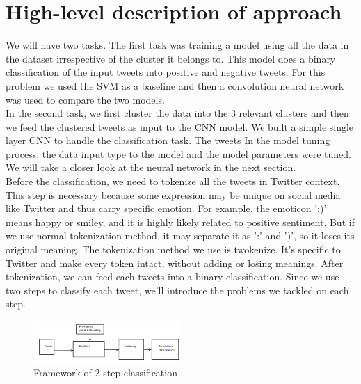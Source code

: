 \documentclass[conference]{IEEEtran}
\begin{document}
\section{High-level description of approach}
We will have two tasks. The first task was training a model using all the data in the dataset irrespective of the cluster it belongs to. This model does a binary classification of the input tweets into positive and negative tweets. For this problem we used the SVM as a baseline and then a convolution neural network was used to compare the two models.
\\ \indent
In the second task, we first cluster the data into the 3 relevant clusters and then we feed the clustered tweets as input to the CNN model. We built a simple single layer CNN to handle the classification task. The tweets  In the model tuning process, the data input type to the model and the model parameters  were tuned. We will take a closer look at the neural network in the next section.
\\ \indent
Before the classification, we need to tokenize all the tweets in Twitter context. This step is necessary because some expression may be unique on social media like Twitter and thus carry specific emotion. For example, the emoticon ':)' means happy or smiley, and it is highly likely related to positive sentiment. But if we use normal tokenization method, it may separate it as ':' and ')', so it loses its original meaning. The tokenization method we use is twokenize. It's specific to Twitter and make every token intact, without adding or losing meanings. After tokenization, we can feed each tweets into a binary classification.
Since we use two steps to classify each tweet, we'll introduce the problems we tackled on each step.
\\ \indent
\begin{figure}[h]
\centering
\includegraphics[width=0.5\textwidth]{Capture(2)}
\caption{Framework of 2-step classification}

\end{figure}
\end{document}
